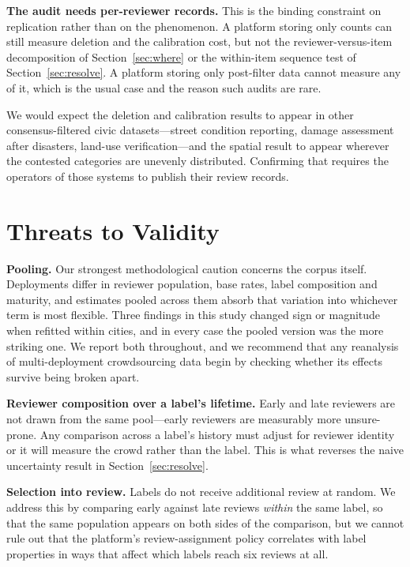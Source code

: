 \documentclass[sigconf]{acmart}
\begin{document}
\textbf{The audit needs per-reviewer records.} This is the binding constraint on
replication rather than on the phenomenon. A platform storing only counts can
still measure deletion and the calibration cost, but not the reviewer-versus-item
decomposition of Section~\ref{sec:where} or the within-item sequence test of
Section~\ref{sec:resolve}. A platform storing only post-filter data cannot
measure any of it, which is the usual case and the reason such audits are rare.

We would expect the deletion and calibration results to appear in other
consensus-filtered civic datasets---street condition reporting, damage
assessment after disasters, land-use verification---and the spatial result to
appear wherever the contested categories are unevenly distributed. Confirming
that requires the operators of those systems to publish their review records.

\section{Threats to Validity}

\textbf{Pooling.} Our strongest methodological caution concerns the corpus
itself. Deployments differ in reviewer population, base rates, label
composition and maturity, and estimates pooled across them absorb that
variation into whichever term is most flexible. Three findings in this study
changed sign or magnitude when refitted within cities, and in every case the
pooled version was the more striking one. We report both throughout, and we
recommend that any reanalysis of multi-deployment crowdsourcing data begin by
checking whether its effects survive being broken apart.

\textbf{Reviewer composition over a label's lifetime.} Early and late reviewers
are not drawn from the same pool---early reviewers are measurably more
unsure-prone. Any comparison across a label's history must adjust for reviewer
identity or it will measure the crowd rather than the label. This is what
reverses the naive uncertainty result in Section~\ref{sec:resolve}.

\textbf{Selection into review.} Labels do not receive additional review at
random. We address this by comparing early against late reviews \emph{within}
the same label, so that the same population appears on both sides of the
comparison, but we cannot rule out that the platform's review-assignment policy
correlates with label properties in ways that affect which labels reach six
reviews at all.
\end{document}
